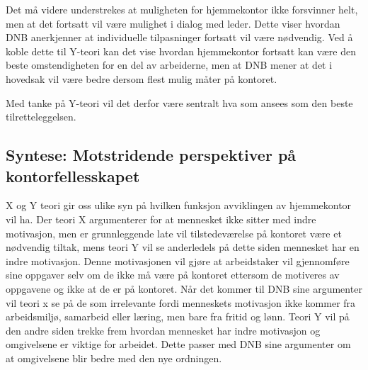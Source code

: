 Det må videre understrekes at muligheten for hjemmekontor ikke forsvinner helt, men at det fortsatt vil være mulighet i dialog med leder. Dette viser hvordan DNB anerkjenner at individuelle tilpasninger fortsatt vil være nødvendig. Ved å koble dette til Y-teori kan det vise hvordan hjemmekontor fortsatt kan være den beste omstendigheten for en del av arbeiderne, men at DNB mener at det i hovedsak vil være bedre dersom flest mulig måter på kontoret.

Med tanke på Y-teori vil det derfor være sentralt hva som ansees som den beste tilretteleggelsen.

\subsection{Syntese: Motstridende perspektiver på kontorfellesskapet}

X og Y teori gir oss ulike syn på hvilken funksjon avviklingen av hjemmekontor vil ha. Der teori X argumenterer for at mennesket ikke sitter med indre motivasjon, men er grunnleggende late vil tilstedeværelse på kontoret være et nødvendig tiltak, mens teori Y vil se anderledels på dette siden mennesket har en indre motivasjon. Denne motivasjonen vil gjøre at arbeidstaker vil gjennomføre sine oppgaver selv om de ikke må være på kontoret ettersom de motiveres av oppgavene og ikke at de er på kontoret. Når det kommer til DNB sine argumenter vil teori x se på de som irrelevante fordi menneskets motivasjon ikke kommer fra arbeidsmiljø, samarbeid eller læring, men bare fra fritid og lønn. Teori Y vil på den andre siden trekke frem hvordan mennesket har indre motivasjon og omgivelsene er viktige for arbeidet. Dette passer med DNB sine argumenter om at omgivelsene blir bedre med den nye ordningen.
